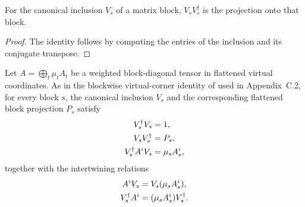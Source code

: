 \begin{lemma}
    \label{thm:block_inclusion_projection}
    \leanok
    For the canonical inclusion $V_s$ of a matrix block,
    $V_sV_s^\dagger$ is the projection onto that block.
\end{lemma}

\begin{proof}\leanok
    The identity follows by computing the entries of the inclusion and its
    conjugate transpose.
\end{proof}

\begin{lemma}
    \label{thm:mpdo_flattened_sector_virtual_compression}
    \leanok
    Let $A=\bigoplus_t \mu_t A_t$ be a weighted block-diagonal tensor in
    flattened virtual coordinates. As in the blockwise virtual-corner identity
    of \cite[Section~2.3, equation \emph{II\_Aiplusk1},
        lines~195--219]{Cirac2016MPDO_arXiv} used in Appendix~C.2, for every
    block $s$, the canonical inclusion $V_s$ and the corresponding flattened
    block projection $P_s$ satisfy
    \begin{align}
        V_s^\dagger V_s    & =1, \notag           \\
        V_sV_s^\dagger     & =P_s, \notag         \\
        V_s^\dagger A^iV_s & =\mu_s A_s^i, \notag
    \end{align}
    together with the intertwining relations
    \begin{align}
        A^iV_s          & =V_s(\mu_sA_s^i), \notag         \\
        V_s^\dagger A^i & =(\mu_sA_s^i)V_s^\dagger. \notag
    \end{align}
\end{lemma}

